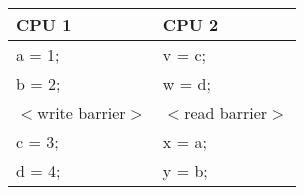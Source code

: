 \centering
\small
\renewcommand{\arraystretch}{1.5}
\begin{tabular}{|p{4cm}|p{4cm}|}
        \hline \textbf{CPU 1}& \textbf{CPU 2}\\[5pt]
        \hline a = 1; & v = c; \\
	\hline b = 2; & w = d; \\
	\hline $<$write barrier$>$ & $<$read barrier$>$ \\
	\hline c = 3; & x = a; \\
	\hline d = 4; & y = b; \\
	\hline
\end{tabular}

